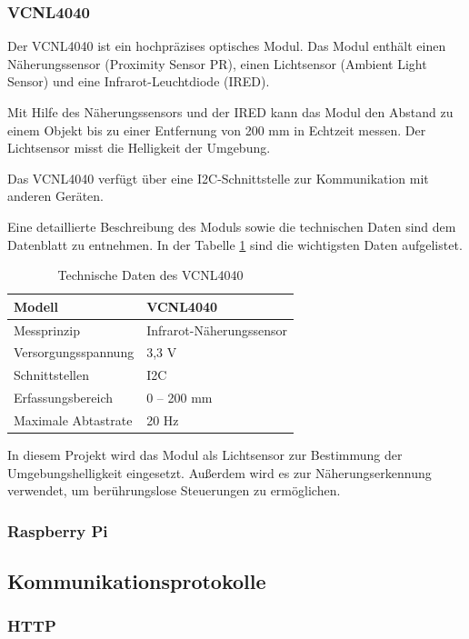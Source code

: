 \documentclass[12pt, letterpaper]{article}
\begin{document}
  \subsubsection{VCNL4040}
  \par Der VCNL4040 ist ein hochpräzises optisches Modul. Das Modul enthält einen Näherungssensor (Proximity Sensor PR), einen Lichtsensor (Ambient Light Sensor) und eine Infrarot-Leuchtdiode (IRED). 
  \par Mit Hilfe des Näherungssensors und der IRED kann das Modul den Abstand zu einem Objekt bis zu einer Entfernung von 200 mm in Echtzeit messen. Der Lichtsensor misst die Helligkeit der Umgebung. 
  \par Das VCNL4040 verfügt über eine I2C-Schnittstelle zur Kommunikation mit anderen Geräten. 
  \par Eine detaillierte Beschreibung des Moduls sowie die technischen Daten sind dem Datenblatt \cite{vcnl4040} zu entnehmen. In der Tabelle \ref{tab:vcnl4040td} sind die wichtigsten Daten aufgelistet.
  \begin{table}[h]
    \centering
    \begin{tabular}{|l|l|}
    \hline
    Modell & VCNL4040 \\ \hline
    Messprinzip & Infrarot-Näherungssensor \\ \hline
    Versorgungsspannung & 3,3 V \\ \hline
    Schnittstellen & I2C \\ \hline
    Erfassungsbereich & 0 – 200 mm \\
    Maximale Abtastrate & 20 Hz \\ \hline
    \end{tabular}
    \caption{Technische Daten des VCNL4040}
    \label{tab:vcnl4040td}
    \end{table}

  \par In diesem Projekt wird das Modul als Lichtsensor zur Bestimmung der Umgebungshelligkeit eingesetzt. Außerdem wird es zur Näherungserkennung verwendet, um berührungslose Steuerungen zu ermöglichen.
  \subsubsection{Raspberry Pi}
  \par 
  \subsection{Kommunikationsprotokolle}
  \subsubsection{HTTP}
\end{document}
